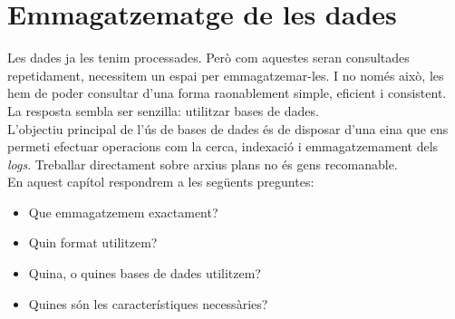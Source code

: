 \chapter{Emmagatzematge de les dades}\label{ch:log-storing}

Les dades ja les tenim processades.
Però com aquestes seran consultades repetidament, necessitem un espai per emmagatzemar-les.
I no només això, les hem de poder consultar d'una forma raonablement simple, eficient i consistent.
La resposta sembla ser senzilla: utilitzar bases de dades. \\

\noindent
L’objectiu principal de l’ús de bases de dades és de disposar d’una eina que ens permeti efectuar operacions com la cerca, indexació i emmagatzemament dels \textit{\gls{log}s}.
Treballar directament sobre arxius plans no és gens recomanable. \\

\noindent
En aquest capítol respondrem a les següents preguntes:
\begin{itemize}
    \item Que emmagatzemem exactament?
    \item Quin format utilitzem?
    \item Quina, o quines bases de dades utilitzem?
    \item Quines són les característiques necessàries?
\end{itemize}

\clearpage

\clearpage
